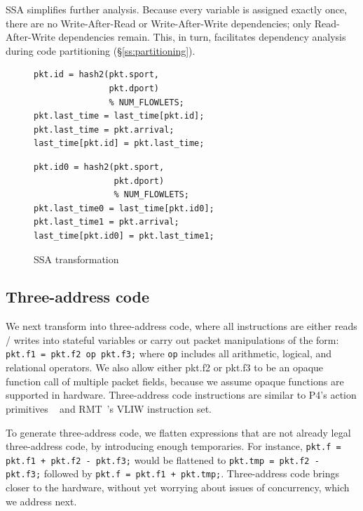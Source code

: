 SSA simplifies further analysis. Because every variable is assigned exactly
once, there are no Write-After-Read or Write-After-Write dependencies; only
Read-After-Write dependencies remain. This, in turn, facilitates dependency analysis
during code partitioning (\S\ref{ss:partitioning}).

\begin{figure}[!t]
  \begin{minipage}{0.48\textwidth}
  \begin{small}
  \begin{lstlisting}[style=customc]
pkt.id = hash2(pkt.sport,
               pkt.dport)
               % NUM_FLOWLETS;
pkt.last_time = last_time[pkt.id];
pkt.last_time = pkt.arrival;
last_time[pkt.id] = pkt.last_time;
  \end{lstlisting}
  \end{small}
  \end{minipage}
  \begin{minipage}{0.52\textwidth}
  \begin{small}
  \begin{lstlisting}[style=customc]
pkt.id0 = hash2(pkt.sport,
                pkt.dport)
                % NUM_FLOWLETS;
pkt.last_time0 = last_time[pkt.id0];
pkt.last_time1 = pkt.arrival;
last_time[pkt.id0] = pkt.last_time1;
  \end{lstlisting}
  \end{small}
  \end{minipage}
  \caption{SSA transformation}
\label{fig:ssa}
\end{figure}

\subsection{Three-address code}
We next transform into three-address code, where all instructions are either
reads / writes into stateful variables or carry out packet manipulations of the
form: \texttt{pkt.f1 = pkt.f2 op pkt.f3;} where \texttt{op} includes all
arithmetic, logical, and relational operators. We also allow either pkt.f2 or
pkt.f3 to be an opaque function call of multiple packet fields, because we
assume opaque functions are supported in hardware. Three-address code
instructions are similar to P4's action primitives ~\cite{p4spec} and
RMT~\cite{rmt}'s VLIW instruction set.

To generate three-address code, we flatten expressions that are not already
legal three-address code, by introducing enough temporaries. For instance,
\texttt{pkt.f = pkt.f1 + pkt.f2 - pkt.f3;} would be flattened to
\texttt{pkt.tmp = pkt.f2 - pkt.f3;} followed by \texttt{pkt.f = pkt.f1 +
pkt.tmp;}. Three-address code brings \pktlanguage closer to the hardware,
without yet worrying about issues of concurrency, which we address next.

